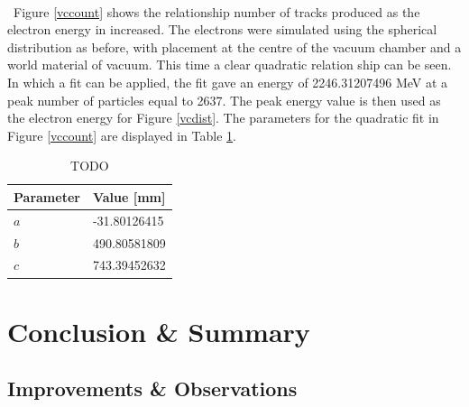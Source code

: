 \documentclass[12pt,a4paper]{article}
\begin{document}
\\\
\noindent Figure \ref{vccount} shows the relationship number of tracks produced as the electron energy in increased. The electrons were simulated using the spherical distribution as before, with placement at the centre of the vacuum chamber and a world material of vacuum. This time a clear quadratic relation ship can be seen. In which a fit can be applied, the fit gave an energy of 2246.31207496 MeV at a peak number of particles equal to 2637. The peak energy value is then used as the electron energy for Figure \ref{vcdist}. The parameters for the quadratic fit in Figure \ref{vccount} are displayed in Table \ref{vctab}.
\\
\begin{table}[h!]
\centering
\begin{tabular}{|l|l|}
\hline
Parameter & Value [mm] \\ \hline
$a$ &  -31.80126415\\ \hline
$b$ &  490.80581809\\ \hline
$c$ &  743.39452632\\ \hline
\end{tabular}
\caption{TODO}
\label{vctab}
\end{table}

\section{Conclusion \& Summary}
\label{conc}

\subsection{Improvements \& Observations}
\end{document}
